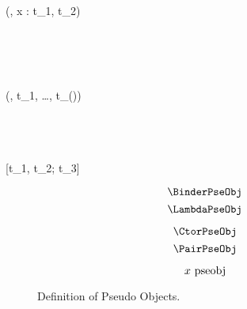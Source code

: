 
\Rule{\BinderPseObj}
    {
         \\
         \\
    }
    {(\kappa, x : t_1, t_2) \pseobj}
    {}

\Rule{\LambdaPseObj}
    {
         \\
         \\
    }
    { \pseobj}
    {}

\Rule{\CtorPseObj}
    {
         \\
    }
    {(\kappa, t_1, \ldots, t_{(\kappa)}) \pseobj}
    {}

\Rule{\PairPseObj}
    {
         \\
         \\
         \\
    }
    {[t_1, t_2; t_3] \pseobj}
    {}

\begin{figure}
    \centering
    \begin{minipage}{0.5\textwidth}
        $$\BinderPseObj$$
        $$\LambdaPseObj$$
    \end{minipage}%
    \begin{minipage}{0.5\textwidth}
        $$\CtorPseObj$$
        $$\PairPseObj$$
    \end{minipage}%
    $$x ~\mbox{\normalfont pseobj}$$
    \caption{Definition of Pseudo Objects.}
    \label{fig:2:pseobj}
\end{figure}
